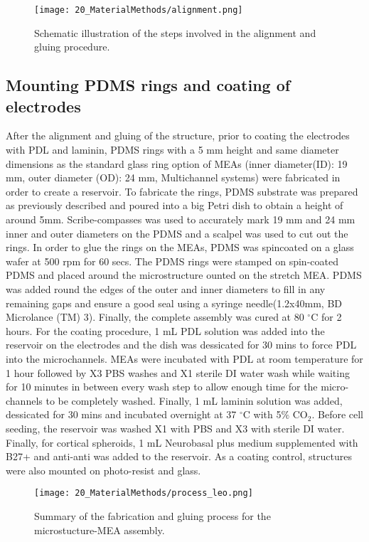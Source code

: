 \documentclass{book}
\begin{document}
\begin{figure}[H]
\centering
\texttt{[image: 20\_MaterialMethods/alignment.png]} 
\caption{Schematic illustration of the steps involved in the alignment and gluing procedure. }
\label{fig:Alig}
\end{figure}


\subsection{Mounting PDMS rings and coating of electrodes}

After the alignment and gluing of the structure, prior to coating the electrodes with PDL and laminin, PDMS rings with a 5 mm height and same diameter dimensions as the standard glass ring option of MEAs (inner diameter(ID): 19 mm, outer diameter (OD): 24 mm, Multichannel systems) were fabricated in order to create a reservoir. To fabricate the rings, PDMS substrate was prepared as previously described and poured into a big Petri dish to obtain a height of around 5mm. Scribe-compasses was used to accurately mark 19 mm and 24 mm inner and outer diameters on the PDMS and a scalpel was used to cut out the rings. In order to glue the rings on the MEAs, PDMS was spincoated on a glass wafer at 500 rpm for 60 secs. The PDMS rings were stamped on spin-coated PDMS and placed around the microstructure ounted on the stretch MEA. PDMS was added round the edges of the outer and inner diameters to fill in any remaining gaps and ensure a good seal using a syringe needle(1.2x40mm, BD Microlance (TM) 3). Finally, the complete assembly was cured at 80 $^{\circ}$C for 2 hours. For the coating procedure, 1 mL PDL solution was added into the reservoir on the electrodes and the dish was dessicated for 30 mins to force PDL into the microchannels. MEAs were incubated with PDL at room temperature for 1 hour followed by X3 PBS washes and X1 sterile DI water wash while waiting for 10 minutes in between every wash step to allow enough time for the micro-channels to be completely washed. Finally, 1 mL laminin solution was added, dessicated for 30 mins and incubated overnight at 37 $^{\circ}$C with 5$\%$ CO$_{2}$. Before cell seeding, the reservoir was washed X1 with PBS and X3 with sterile DI water. Finally, for cortical spheroids, 1 mL Neurobasal plus medium supplemented with B27+ and anti-anti was added to the reservoir. As a coating control, structures were also mounted on photo-resist and glass.

\begin{figure}[H]
\centering
\texttt{[image: 20\_MaterialMethods/process\_leo.png]} 
\caption{Summary of the fabrication and gluing process for the microstucture-MEA assembly.}
\label{fig:Process}
\end{figure}
\end{document}
